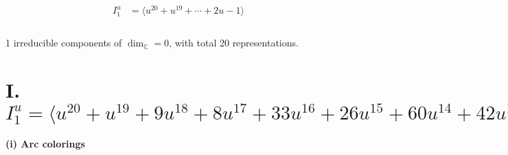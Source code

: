 \documentclass[1p]{elsarticle_modified}
\theoremstyle{definition}
\begin{document}
\begin{align*}
I^u_{1}&=\langle 
u^{20}+u^{19}+\cdots+2 u-1\rangle \\
\\
\end{align*}
\raggedright * 1 irreducible components of $\dim_{\mathbb{C}}=0$, with total 20 representations.\\
\newpage
\renewcommand{\arraystretch}{1}
\centering \section*{I. $I^u_{1}= \langle u^{20}+u^{19}+9 u^{18}+8 u^{17}+33 u^{16}+26 u^{15}+60 u^{14}+42 u^{13}+48 u^{12}+31 u^{11}-3 u^{10}+2 u^9-25 u^8-10 u^7-2 u^6-4 u^5+9 u^4+u^3+u^2+2 u-1 \rangle$}
\flushleft \textbf{(i) Arc colorings}\\
\end{document}
